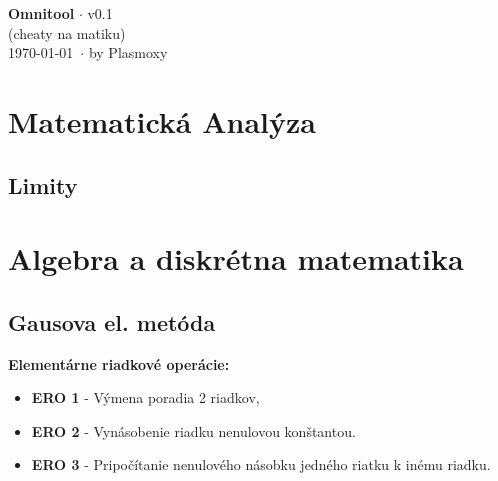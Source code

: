\documentclass[10pt,a4paper]{article}
\begin{document}
	\begin{center}
		\Large{\textbf{Omnitool} $\cdot$ v0.1}\\
		(cheaty na matiku)\\
		\today\ $\cdot$ by Plasmoxy
	\end{center}

	\section{Matematická Analýza}
	
	\subsection{Limity}
	
	\section{Algebra a diskrétna matematika}
	\subsection{Gausova el. metóda}
	\textbf{Elementárne riadkové operácie:}
	\begin{itemize}
		\item \textbf{ERO 1} - Výmena poradia 2 riadkov,
		\item \textbf{ERO 2} - Vynásobenie riadku nenulovou konštantou.
		\item \textbf{ERO 3} - Pripočítanie nenulového násobku jedného riatku k inému riadku.
	\end{itemize}
	
	
\end{document}

